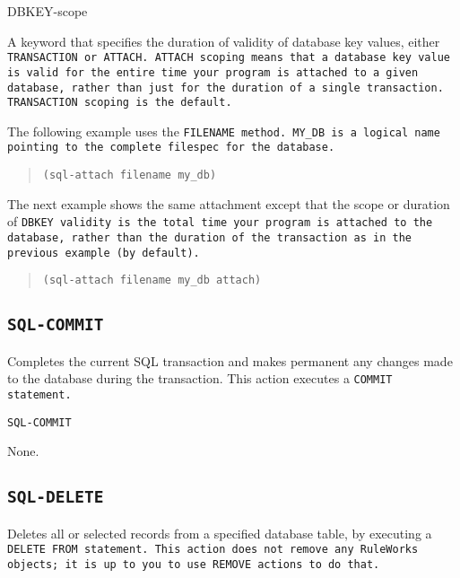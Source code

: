 {{\begin{arguments}
\item[DBKEY-scope]

  A keyword that specifies the duration of validity of database key
  values, either \tt{TRANSACTION} or \tt{ATTACH}. \tt{ATTACH} scoping
  means that a database key value is valid for the entire time your
  program is attached to a given database, rather than just for the
  duration of a single transaction. \tt{TRANSACTION} scoping is the
  default.
\end{arguments}

\Example

The following example uses the \tt{FILENAME} method. \verb|MY_DB| is a
logical name pointing to the complete filespec for the
database.

\begin{quote}
\begin{verbatim}
(sql-attach filename my_db)
\end{verbatim}
\end{quote}

The next example shows the same attachment except that the scope or
duration of \tt{DBKEY} validity is the total time your program is attached
to the database, rather than the duration of the transaction as in the
previous example (by default).

\begin{quote}
\begin{verbatim}
(sql-attach filename my_db attach)
\end{verbatim}
\end{quote}

\subsection{\tt{SQL-COMMIT}}

Completes the current SQL transaction and makes permanent any changes
made to the database during the transaction. This action executes a
\tt{COMMIT} statement.

\Format

\tt{SQL-COMMIT}

\Arguments

None.

\subsection{\tt{SQL-DELETE}}

Deletes all or selected records from a specified database table, by
executing a \tt{DELETE FROM} statement. This action does not remove
any RuleWorks objects; it is up to you to use \tt{REMOVE} actions to
do that.

}}
